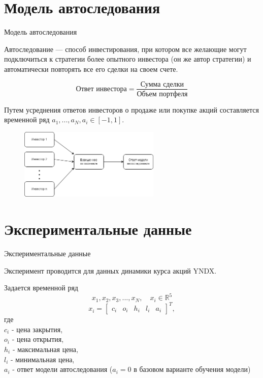 \documentclass[10pt,pdf,hyperref={unicode}]{beamer}
\begin{document}
\section{Модель автоследования}
\begin{frame}{Модель автоследования}

Автоследование --- способ инвестирования, при котором все желающие могут подключиться к стратегии более опытного инвестора (он же автор стратегии) и автоматически повторять все его сделки на своем счете. 

\[\text{Ответ инвестора} = \frac{\text{Сумма сделки}}{\text{Объем портфеля}}\]

Путем усреднения ответов инвесторов о продаже или покупке акций составляется временной ряд $a_{1}, ..., a_{N}, a_{i} \in [-1, 1]$.

\begin{figure}[h!t]\center
{\includegraphics[width=0.6\textwidth]{results/voting.png}}
\end{figure}

\end{frame}

\section{Экспериментальные данные}
\begin{frame}{Экспериментальные данные}

Эксперимент проводится для данных динамики курса акций YNDX.

Задается временной ряд 
$$x_{1}, x_{2}, x_{3}, ..., x_{N}, \quad x_{i} \in \mathbb{R}^{5}$$
$$
    x_{i} = 
    \begin{bmatrix}
        c_{i} & o_{i} & h_{i} & l_{i} & a_{i}
    \end{bmatrix}^{T},
$$
где \\
$c_{i}$ - цена закрытия, \\
$o_{i}$ - цена открытия, \\
$h_{i}$ - максимальная цена, \\
$l_{i}$ - минимальная цена, \\
$a_{i}$ - ответ модели автоследования ($a_{i} = 0$ в базовом варианте обучения модели)

\end{frame}
\end{document}
